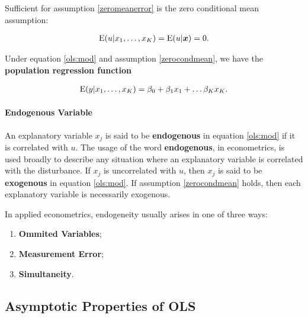 \documentclass[11pt, oneside, a4paper, article]{article}
\numberwithin{equation}{section}
\begin{document}
Sufficient for assumption \eqref{zeromeanerror} is the zero conditional mean assumption:

\vspace{-1 em}
\begin{align} \label{zerocondmean}
	\text{E}( u | x_{1}, \dots, x_{K} ) = \text{E}( u | \boldsymbol{x}) = 0.
\end{align}

Under equation \eqref{ols:mod} and assumption \eqref{zerocondmean}, we have the \textbf{population regression function}

\vspace{-1 em}
\begin{align} \label{pop:regfun}
	\text{E}( y | x_{1}, \dots, x_{K} ) = \beta_{0} + \beta_{1} x_{1} + \dots \beta_{K} x_{K}. 
\end{align}

\paragraph{Endogenous Variable}

An explanatory variable $x_{j}$ is said to be \textbf{endogenous} in equation \eqref{ols:mod} if it is correlated with $u$.
The usage of the word \textbf{endogenous}, in econometrics, is used broadly to describe any situation where an explanatory variable is correlated with the disturbance.
If $x_{j}$ is uncorrelated with $u$, then $x_{j}$ is said to be \textbf{exogenous} in equation \eqref{ols:mod}.
If assumption \eqref{zerocondmean} holds, then each explanatory variable is necessarily exogenous.

In applied econometrics, endogeneity usually arises in one of three ways:

\vspace{-1 em}
\begin{enumerate}[noitemsep]
	\item \textbf{Ommited Variables};
	\item \textbf{Measurement Error};
	\item \textbf{Simultaneity}. 
\end{enumerate}

\subsection{Asymptotic Properties of OLS} 
\noindent
\citet[Sec. 4.2 -- Asymptotic Properties of OLS; p.51]{wool-2010}
\end{document}
